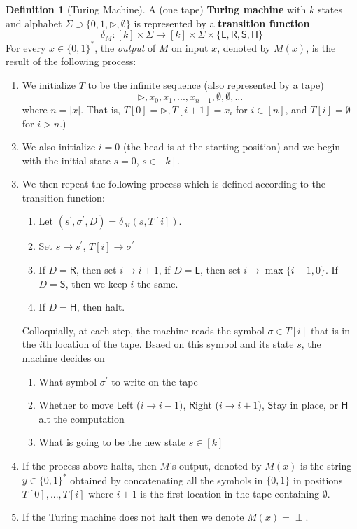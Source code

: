 \documentclass[a4paper, 12pt]{report}
\theoremstyle{remark}
\theoremstyle{definition}
\newtheorem{definition}{Definition}[section]
\begin{document}
\begin{definition}[Turing Machine]
A (one tape) \textbf{Turing machine} with $k$ states and alphabet $\Sigma \supset \{0, 1, \triangleright, \emptyset\}$ is represented by a \textbf{transition function} 
\[\delta_M: [k] \times \Sigma \longrightarrow [k] \times \Sigma \times \{\mathsf{L, R, S, H}\}\]
For every $x \in \{0,1\}^*$, the \textit{output} of $M$ on input $x$, denoted by $M(x)$, is the result of the following process: 
\begin{enumerate}
    \item We initialize $T$ to be the infinite sequence (also represented by a tape)
    \[\triangleright, x_0, x_1, ..., x_{n-1}, \emptyset, \emptyset, ...\]
    where $n = |x|$. That is, $T[0] = \triangleright, T[i+1] = x_i$ for $i \in [n]$, and $T[i] = \emptyset$ for $i>n$.)
    \item We also initialize $i = 0$ (the head is at the starting position) and we begin with the initial state $s=0$, $s \in [k]$. 
    \item We then repeat the following process which is defined according to the transition function: 
    \begin{enumerate}
        \item Let $(s^\prime, \sigma^\prime, D) = \delta_M (s, T[i])$.
        \item Set $s \rightarrow s^\prime$, $T[i] \rightarrow \sigma^\prime$
        \item If $D = \mathsf{R}$, then set $i \rightarrow i+1$, if $D = \mathsf{L}$, then set $i \rightarrow \max\{i-1,0\}$. If $D = \mathsf{S}$, then we keep $i$ the same. 
        \item If $D = \mathsf{H}$, then halt. 
    \end{enumerate}
    Colloquially, at each step, the machine reads the symbol $\sigma \in T[i]$ that is in the $i$th location of the tape. Bsaed on this symbol and its state $s$, the machine decides on
    \begin{enumerate}
        \item What symbol $\sigma^\prime$ to write on the tape
        \item Whether to move $\mathsf{L}$eft ($i \rightarrow i-1)$, $\mathsf{R}$ight ($i \rightarrow i+1$), $\mathsf{S}$tay in place, or $\mathsf{H}$alt the computation 
        \item What is going to be the new state $s \in [k]$
    \end{enumerate}
    \item If the process above halts, then $M$'s output, denoted by $M(x)$ is the string $y \in \{0,1\}^*$ obtained by concatenating all the symbols in $\{0,1\}$ in positions $T[0], ..., T[i]$ where $i+1$ is the first location in the tape containing $\emptyset$. 
    \item If the Turing machine does not halt then we denote $M(x) = \perp$. 
\end{enumerate}
\end{definition}
\end{document}
